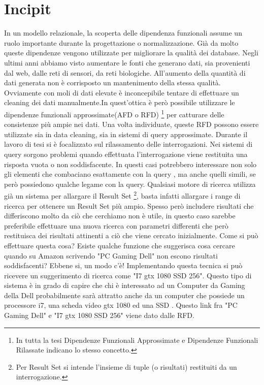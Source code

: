 \section{Incipit}

In un modello relazionale, la scoperta delle dipendenza funzionali assume un ruolo importante durante la progettazione o normalizzazione. Già da molto queste dipendenze vengono utilizzate per migliorare la qualità dei database.
Negli ultimi anni abbiamo visto aumentare le fonti che generano dati, sia provenienti dal web, dalle reti di sensori, da reti biologiche. All’aumento della quantità di dati generata non è corrisposto un mantenimento della stessa qualità. Ovviamente con moli di dati elevate è inconcepibile tentare di effettuare un cleaning dei dati manualmente.In quest’ottica è però possibile utilizzare le dipendenze funzionali approssimate(AFD o RFD) \footnote{In tutta la tesi Dipendenze Funzionali Approssimate e Dipendenze Funzionali Rilassate indicano lo stesso concetto.} per catturare delle consistenze più ampie nei dati.
Una volta individuate, queste RFD possono essere utilizzate sia in data cleaning, sia in sistemi di query approssimate. Durante il lavoro di tesi si è focalizzato sul rilassamento delle interrogazioni. Nei sistemi di query sorgono problemi quando effettuata l'interrogazione viene restituita una risposta vuota o non soddisfacente. In questi casi potrebbero interessare non solo gli elementi che combaciano esattamente con la query , ma anche quelli simili, se però possiedono qualche legame con la query. Qualsiasi motore di ricerca utilizza già un sistema per allargare il Result Set \footnote{Per Result Set si intende l'insieme di tuple (o risultati) restituiti da un interrogazione.}, basta infatti allargare i range di ricerca per ottenere un Result Set più ampio. Spesso però includere risultati che differiscono molto da ciò che cerchiamo non è utile, in questo caso sarebbe preferibile effettuare una nuova ricerca con parametri differenti che però restituisca dei risultati attinenti a ciò che viene cercato inizialmente. Come si può effettuare questa cosa? Esiste qualche funzione che suggerisca cosa cercare quando su Amazon scrivendo "PC Gaming Dell" non escono risultati soddisfacenti? Ebbene si, un modo c'è! Implementando questa tecnica si può ricevere un suggerimento di ricerca come "I7 gtx 1080 SSD 256". Questo tipo di sistema è in grado di capire che chi è interessato ad un Computer da Gaming della Dell probabilmente sarà attratto anche da un computer che possiede un processore i7, una scheda video gtx 1080 ed una SSD .
Questo link fra "PC Gaming Dell" e "I7 gtx 1080 SSD 256" viene dato dalle RFD.

